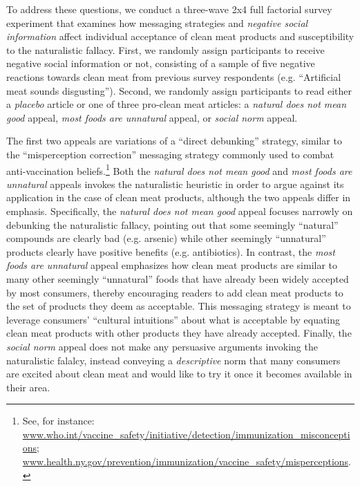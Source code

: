 \documentclass[12pt]{article}
\begin{document}
To address these questions, we conduct a three-wave 2x4 full factorial survey experiment that examines how messaging strategies and \textit{negative social information} affect individual acceptance of clean meat products and susceptibility to the naturalistic fallacy. First, we randomly assign participants to receive negative social information or not, consisting of a sample of five negative reactions towards clean meat from previous survey respondents (e.g. ``Artificial meat sounds disgusting''). Second, we randomly assign participants to read either a \textit{placebo} article or one of three pro-clean meat articles: a \textit{natural does not mean good} appeal, \textit{most foods are unnatural} appeal, or \textit{social norm} appeal.

The first two appeals are variations of a ``direct debunking'' strategy, similar to the ``misperception correction'' messaging strategy commonly used to combat anti-vaccination beliefs.\footnote{See, for instance: \href{http://www.who.int/vaccine_safety/initiative/detection/immunization_misconceptions}{www.who.int/vaccine\_safety/initiative/detection/immunization\_misconceptions}; \href{https://www.health.ny.gov/prevention/immunization/vaccine_safety/misperceptions}{www.health.ny.gov/prevention/immunization/vaccine\_safety/misperceptions}.} Both the \textit{natural does not mean good} and \textit{most foods are unnatural} appeals invokes the naturalistic heuristic in order to argue against its application in the case of clean meat products, although the two appeals differ in emphasis. Specifically, the \textit{natural does not mean good} appeal focuses narrowly on debunking the naturalistic fallacy, pointing out that some seemingly ``natural'' compounds are clearly bad (e.g. arsenic) while other seemingly ``unnatural'' products clearly have positive benefits (e.g. antibiotics). In contrast, the \textit{most foods are unnatural} appeal emphasizes how clean meat products are similar to many other seemingly ``unnatural'' foods that have already been widely accepted by most consumers, thereby encouraging readers to add clean meat products to the set of products they deem as acceptable. This messaging strategy is meant to leverage consumers' ``cultural intuitions'' \citep{Miton2015} about what is acceptable by equating clean meat products with other products they have already accepted. Finally, the \textit{social norm} appeal does not make any persuasive arguments invoking the naturalistic falalcy, instead conveying a \textit{descriptive} norm that many consumers are excited about clean meat and would like to try it once it becomes available in their area.
\end{document}
